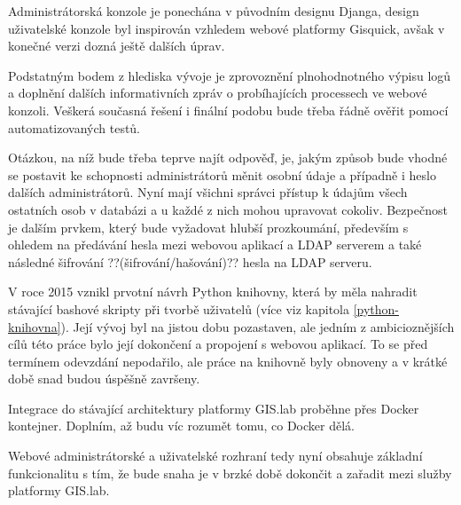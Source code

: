 Administrátorská konzole je ponechána v původním designu Djanga, design uživatelské konzole byl inspirován vzhledem webové platformy Gisquick, avšak v konečné verzi dozná ještě dalších úprav.

Podstatným bodem z hlediska vývoje je zprovoznění plnohodnotného výpisu logů a doplnění dalších informativních zpráv o probíhajících processech ve webové konzoli. Veškerá současná řešení i finální podobu bude třeba řádně ověřit pomocí automatizovaných testů.

Otázkou, na níž bude třeba teprve najít odpověď, je, jakým způsob bude vhodné se postavit ke schopnosti administrátorů měnit osobní údaje a případně i heslo dalších administrátorů. Nyní mají všichni správci přístup k údajům všech ostatních osob v databázi a u každé z nich mohou upravovat cokoliv. Bezpečnost je dalším prvkem, který bude vyžadovat hlubší prozkoumání, především s ohledem na předávání hesla mezi webovou aplikací a LDAP serverem a také následné šifrování ??(šifrování/hašování)?? hesla na LDAP serveru. 

V roce 2015 vznikl prvotní návrh Python knihovny, která by měla nahradit stávající bashové skripty při tvorbě uživatelů (více viz kapitola \ref{python-knihovna}). Její vývoj byl na jistou dobu pozastaven, ale jedním z ambicioznějších cílů této práce bylo její dokončení a propojení s webovou aplikací. To se před termínem odevzdání nepodařilo, ale práce na knihovně byly obnoveny a v krátké době snad budou úspěšně završeny.

Integrace do stávající architektury platformy GIS.lab proběhne přes Docker kontejner. Doplním, až budu víc rozumět tomu, co Docker dělá.

Webové administrátorské a uživatelské rozhraní tedy nyní obsahuje základní funkcionalitu s tím, že bude snaha je v brzké době dokončit a zařadit mezi služby platformy GIS.lab.